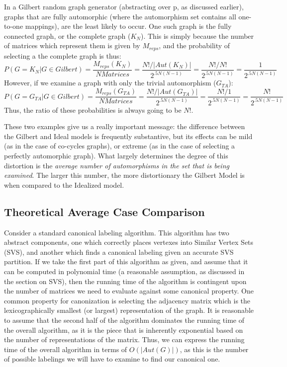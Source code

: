 In a Gilbert random graph generator (abstracting over p, as discussed earlier), graphs that are fully automorphic (where the automorphism set contains all one-to-one mappings), are the least likely to occur.
One such graph is the fully connected graph, or the complete graph ($K_N$).
This is simply because the number of matrices which represent them is given by $M_{reps}$, and the probability of selecting a the complete graph is thus:
$$P(G = K_N | G \in Gilbert) =  \frac{M_{reps}(K_N)}{NMatrices} = \frac{N! / |Aut(K_N)|}{2^{.5N(N-1)}} = \frac{N! / N!}{2^{.5N(N-1)}} = \frac{1}{2^{.5N(N-1)}}$$
However, if we examine a graph with only the trivial automorphism ($G_{TA}$):
$$P(G = G_{TA} | G \in Gilbert) =  \frac{M_{reps}(G_{TA})}{NMatrices} = \frac{N! / |Aut(G_{TA})|}{2^{.5N(N-1)}} = \frac{N! / 1}{2^{.5N(N-1)}} = \frac{N!}{2^{.5N(N-1)}}$$
Thus, the ratio of these probabilities is always going to be $N!$.

These two examples give us a really important message: the difference between the Gilbert and Ideal models is frequently substantive, but its effects can be mild (as in the case of co-cycles graphs), or extreme (as in the case of selecting a perfectly automorphic graph).
What largely determines the degree of this distortion is the \emph{average number of automorphisms in the set that is being examined}. 
The larger this number, the more distortionary the Gilbert Model is when compared to the Idealized model.

\subsection{Theoretical Average Case Comparison}

Consider a standard canonical labeling algorithm.
This algorithm has two abstract components, one which correctly places vertexes into Similar Vertex Sets (SVS), and another which finds a canonical labeling given an accurate SVS partition.
If we take the first part of this algorithm as given, and assume that it can be computed in polynomial time (a reasonable assumption, as discussed in the section on SVS), then the running time of the algorithm is contingent upon the number of matrices we need to evaluate against some canonical property.
One common property for canonization is selecting the adjacency matrix which is the lexicographically smallest (or largest) representation of the graph.
It is reasonable to assume that the second half of the algorithm dominates the running time of the overall algorithm, as it is the piece that is inherently exponential based on the number of representations of the matrix.
Thus,  we can express the running time of the overall algorithm in terms of $O(|Aut(G)|)$, as this is the number of possible labelings we will have to examine to find our canonical one.

